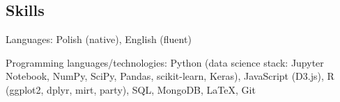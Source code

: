 \documentclass[margin,line]{resume}
\begin{document}
\begin{resume}

    \section{\mysidestyle Skills}
    \begin{list2}
        \item Languages: Polish (native), English (fluent)
        \item Programming languages/technologies: Python (data science stack: Jupyter Notebook, NumPy, SciPy, Pandas, scikit-learn, Keras), JavaScript (D3.js), R (ggplot2, dplyr, mirt, party), SQL, MongoDB, LaTeX, Git
    \end{list2}

\end{resume}
\end{document}
